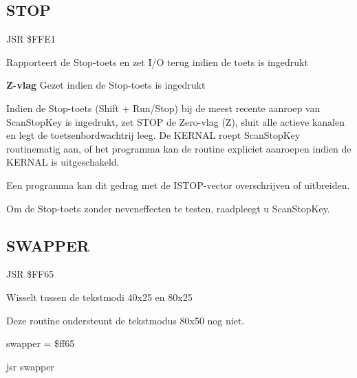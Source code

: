 \subsection{STOP}
\label{KERNAL Jump Table!STOP}
\begin{description}[leftmargin=2cm,style=nextline]
    \item [Adres:] JSR \$FFE1    \item [Omschrijving:] Rapporteert de Stop-toets en zet I/O terug indien de toets is ingedrukt    \item [Uitvoer:]        \textbf{Z-vlag} Gezet indien de Stop-toets is ingedrukt    \item [Opmerkingen:]        Indien de Stop-toets (Shift + Run/Stop) bij de meest recente aanroep van ScanStopKey is ingedrukt, zet STOP de Zero-vlag (Z), sluit alle actieve kanalen en legt de toetsenbordwachtrij leeg. De KERNAL roept ScanStopKey routinematig aan, of het programma kan de routine expliciet aanroepen indien de KERNAL is uitgeschakeld.

        Een programma kan dit gedrag met de ISTOP-vector overschrijven of uitbreiden.

        Om de Stop-toets zonder neveneffecten te testen, raadpleegt u ScanStopKey.    \item [Voorbeeld:]
\end{description}



\newpage
\subsection{SWAPPER}
\label{KERNAL Jump Table!SWAPPER}
\begin{description}[leftmargin=2cm,style=nextline]
    \item [Adres:] JSR \$FF65    \item [Omschrijving:] Wisselt tussen de tekstmodi 40x25 en 80x25    \item [Opmerkingen:]        Deze routine ondersteunt de tekstmodus 80x50 nog niet.    \item [Voorbeeld:]
        \begin{asmcode}
swapper = \$ff65

    jsr swapper
        \end{asmcode}
\end{description}



